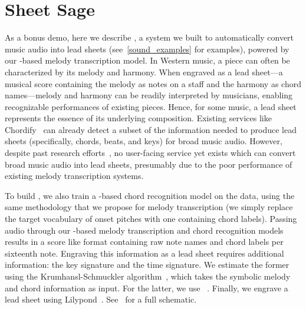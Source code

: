 \vspace{-2mm}
\section{Sheet Sage}
\label{sec:sheetsage}

As a bonus demo, 
here we describe \sheetsage, a system we built to automatically convert music audio into lead sheets (see~\cref{sound_examples} for examples), powered by our \jukebox-based melody transcription model. 
In Western music, a piece can often be characterized by its melody and harmony. 
When engraved as a lead sheet---a musical score containing the melody as notes on a staff and the harmony as chord names---melody and harmony can be readily interpreted by musicians, enabling recognizable performances of existing pieces. 
Hence, for some music, a lead sheet represents the essence of its underlying composition.
Existing services like Chordify~\cite{de2014chordify} can already detect a subset of the information needed to produce lead sheets (specifically, chords, beats, and keys) for broad music audio. 
However, despite past research efforts~\cite{ryynanen2008automatic,weil2009automatic}, no user-facing service yet exists which can convert broad music audio into lead sheets, presumably due to the poor performance of existing melody transcription systems.

To build \sheetsage, we also train a \jukebox-based chord recognition model on the \hooktheory{} data, using the same methodology that we propose for melody transcription (we simply replace the target vocabulary of onset pitches with one containing chord labels).
Passing audio through our \jukebox{}-based melody transcription and chord recognition models results in a score like format containing raw note names and chord labels per sixteenth note. 
Engraving this information as a lead sheet requires additional information: the key signature and the time signature. 
We estimate the former using the Krumhansl-Schmuckler algorithm~\cite{krumhansl1990cognitive,temperley1999key}, which takes the symbolic melody and chord information as input. 
For the latter, we use \madmom~\cite{bock2016madmom,bock2016joint}. 
Finally, we engrave a lead sheet using Lilypond~\cite{nienhuys2003lilypond}. 
See~ for a full schematic.


